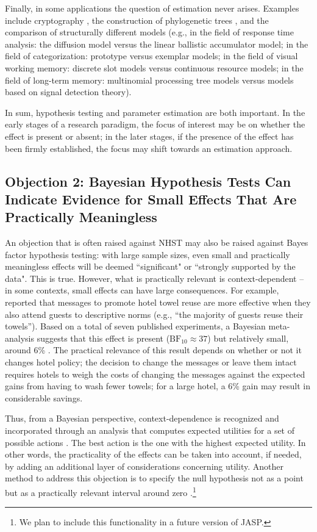 Finally, in some applications the question of estimation never arises. Examples include cryptography \cite{Turing19412012,Zabell2012}, the construction of phylogenetic trees \cite{HuelsenbeckRonquist2001}, and the comparison of structurally different models (e.g., in the field of response time analysis: the diffusion model versus the linear ballistic accumulator model; in the field of categorization: prototype versus exemplar models; in the field of visual working memory: discrete slot models versus continuous resource models; in the field of long-term memory: multinomial processing tree models versus models based on signal detection theory).

In sum, hypothesis testing and parameter estimation are both important. In the early stages of a research paradigm, the focus of interest may be on whether the effect is present or absent; in the later stages, if the presence of the effect has been firmly established, the focus may shift towards an estimation approach.

\subsection{Objection 2: Bayesian Hypothesis Tests Can Indicate Evidence for Small Effects That Are Practically Meaningless}
An objection that is often raised against NHST may also be raised against Bayes factor hypothesis testing: with large sample sizes, even small and practically meaningless effects will be deemed ``significant" or ``strongly supported by the data". This is true. However, what is practically relevant is context-dependent -- in some contexts, small effects can have large consequences. For example,  reported that messages to promote hotel towel reuse are more effective when they also attend guests to descriptive norms (e.g., ``the majority of guests reuse their towels''). Based on a total of seven published experiments, a Bayesian meta-analysis suggests that this effect is present ($\text{BF}_{10} \approx 37$) but relatively small, around 6\% \cite{ScheibehenneEtAlinpress}. The practical relevance of this result depends on whether or not it changes hotel policy; the decision to change the messages or leave them intact requires hotels to weigh the costs of changing the messages against the expected gains from having to wash fewer towels; for a large hotel, a 6\% gain may result in considerable savings.

Thus, from a Bayesian perspective, context-dependence is recognized and incorporated through an analysis that computes expected utilities for a set of possible actions \cite{Lindley1985}. The best action is the one with the highest expected utility. In other words, the practicality of the effects can be taken into account, if needed, by adding an additional layer of considerations concerning utility. Another method to address this objection is to specify the null hypothesis not as a point but as a practically relevant interval around zero \cite{MoreyRouder2011}.\footnote{We plan to include this functionality in a future version of JASP.}

